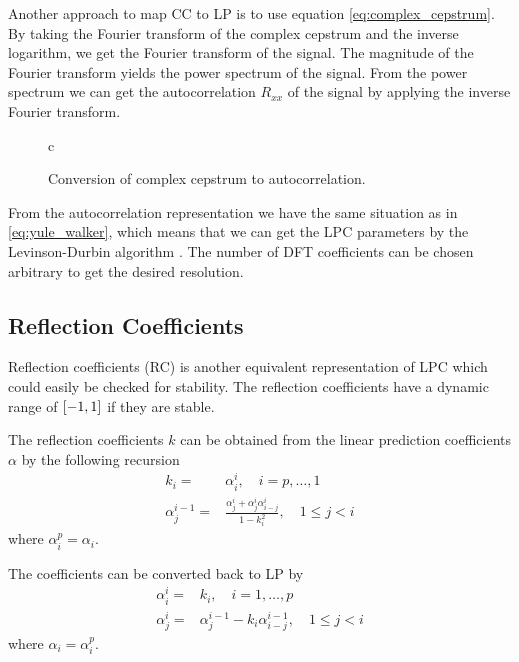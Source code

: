 Another approach to map CC to LP is to use equation \eqref{eq:complex_cepstrum}. By taking the Fourier transform of the complex cepstrum and the inverse logarithm, we get the Fourier transform of the signal. The magnitude of the Fourier transform yields the power spectrum of the signal. From the power spectrum we can get the autocorrelation $R_{xx}$ of the signal by applying the inverse Fourier transform.
\begin{figure}[htbp]
  \centering
  \begin{tabular}[h]{c}
  \end{tabular}
  \caption{Conversion of complex cepstrum to autocorrelation.}
  \label{fig:cc2ar}
\end{figure}
From the autocorrelation representation we have the same situation as in \eqref{eq:yule_walker}, which means that we can get the LPC parameters by the Levinson-Durbin algorithm \cite{cybenko80}. The number of DFT coefficients can be chosen arbitrary to get the desired resolution.

\subsection{Reflection Coefficients} %
\label{sub:reflection_coefficients}
Reflection coefficients (RC) is another equivalent representation of LPC which could easily be checked for stability. The reflection coefficients have a dynamic range of $\left[-1,1\right]$ if they are stable. 

The reflection coefficients $k$ can be obtained from the linear prediction coefficients $\alpha$ by the following recursion
\begin{equation}
	\label{eq:ar2rf}
	\begin{split}
		k_i = & \alpha_i^i, \quad i=p,\dotsc,1 \\
		\alpha_j^{i-1} = & \frac{\alpha_j^i+\alpha_j^i \alpha_{i-j}^i}{1-k_i^2}, \quad 1\leq j<i
	\end{split}
\end{equation}
where $\alpha_i^p=\alpha_i$.

The coefficients can be converted back to LP by \cite{taletek}
\begin{equation}
	\label{eq:rf2ar}
	\begin{split}
		\alpha_i^i = & k_i, \quad i=1,\dotsc,p \\
		\alpha_j^i = & \alpha_j^{i-1}-k_i \alpha_{i-j}^{i-1}, \quad 1\leq j<i
	\end{split}
\end{equation}
where $\alpha_i=\alpha_i^p$.

